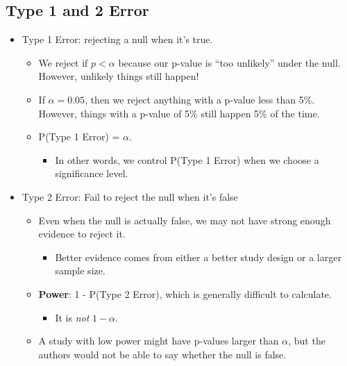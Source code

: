\documentclass[
  letterpaper,
  DIV=11,
  numbers=noendperiod,
  oneside]{scrreprt}
\providecommand{\tightlist}{%
  \setlength{\itemsep}{0pt}\setlength{\parskip}{0pt}}\usepackage{longtable,booktabs,array}
\begin{document}
\hypertarget{type-1-and-2-error}{%
\subsection{Type 1 and 2 Error}\label{type-1-and-2-error}}

\begin{itemize}
\tightlist
\item
  Type 1 Error: rejecting a null when it's true.

  \begin{itemize}
  \tightlist
  \item
    We reject if \(p < \alpha\) because our p-value is ``too unlikely''
    under the null. However, unlikely things still happen!
  \item
    If \(\alpha=0.05\), then we reject anything with a p-value less than
    5\%. However, things with a p-value of 5\% still happen 5\% of the
    time.
  \item
    P(Type 1 Error) = \(\alpha\).

    \begin{itemize}
    \tightlist
    \item
      In other words, we control P(Type 1 Error) when we choose a
      significance level.
    \end{itemize}
  \end{itemize}
\item
  Type 2 Error: Fail to reject the null when it's false

  \begin{itemize}
  \tightlist
  \item
    Even when the null is actually false, we may not have strong enough
    evidence to reject it.

    \begin{itemize}
    \tightlist
    \item
      Better evidence comes from either a better study design or a
      larger sample size.
    \end{itemize}
  \item
    \textbf{Power}: 1 - P(Type 2 Error), which is generally difficult to
    calculate.

    \begin{itemize}
    \tightlist
    \item
      It is \emph{not} \(1-\alpha\).
    \end{itemize}
  \item
    A study with low power might have p-values larger than \(\alpha\),
    but the authors would not be able to say whether the null is false.
  \end{itemize}
\end{itemize}
\end{document}
